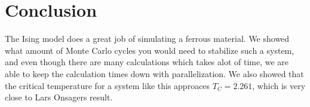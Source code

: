 \documentclass[../main.tex]{subfiles}
\begin{document}
\section{Conclusion}
The Ising model does a great job of simulating a ferrous material. We showed what amount of Monte Carlo cycles you would need to stabilize such a system, and even though there are many calculations which takes alot of time, we are able to keep the calculation times down with parallelization. We also showed that the critical temperature for a system like this approaces $T_C = 2.261$, which is very close to Lars Onsagers result.
\end{document}
